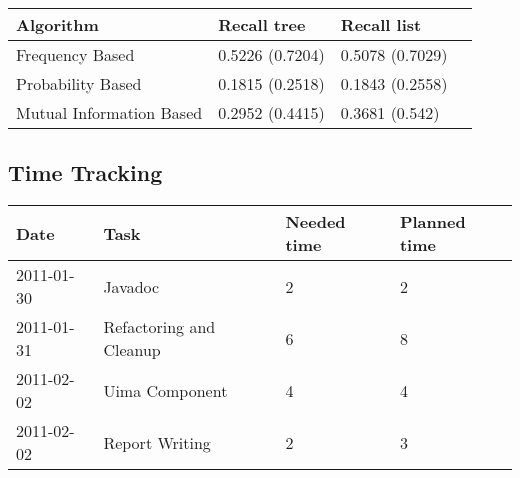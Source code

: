 \documentclass[11pt, accentcolor=tud9b, nochapname]{tudexercise}
\begin{document}
\vspace{10pt}
\begin{tabular}{l | l | l | l}
  \hline
  \textbf{Algorithm} & \textbf{Recall tree} & \textbf{Recall list} \\ \hline
  Frequency Based & 0.5226 (0.7204) & 0.5078 (0.7029) \\ \hline
  Probability Based & 0.1815 (0.2518) & 0.1843 (0.2558) \\ \hline
  Mutual Information Based & 0.2952 (0.4415) & 0.3681 (0.542) \\ \hline
\end{tabular}
\vspace{10pt}


\subsection{Time Tracking}

\begin{tabular}{l | l | l | l}
  \hline
  \textbf{Date} & \textbf{Task} & \textbf{Needed time} & \textbf{Planned time} \\ \hline
  2011-01-30 & Javadoc & 2 & 2 \\ \hline
  2011-01-31 & Refactoring and Cleanup & 6 & 8 \\ \hline
  2011-02-02 & Uima Component & 4 & 4 \\ \hline
  2011-02-02 & Report Writing & 2 & 3 \\ \hline
\end{tabular}
\end{document}
